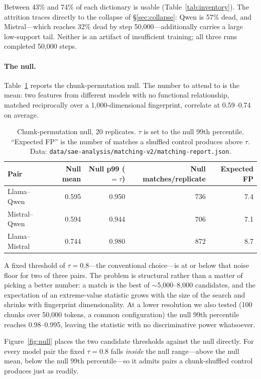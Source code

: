 \documentclass[11pt]{article}
\begin{document}
Between 43\% and 74\% of each dictionary is usable (Table~\ref{tab:inventory}). The
attrition traces directly to the collapse of \S\ref{sec:collapse}: Qwen is 57\% dead,
and Mistral---which reaches 32\% dead by step 50{,}000---additionally carries a large
low-support tail. Neither is an artifact of insufficient training; all three runs
completed 50{,}000 steps.

\paragraph{The null.} Table~\ref{tab:null} reports the chunk-permutation null. The
number to attend to is the mean: two features from different models with no functional
relationship, matched reciprocally over a 1{,}000-dimensional fingerprint, correlate at
0.59--0.74 on average.

\begin{table}[t]
  \centering
  \caption{Chunk-permutation null, 20 replicates. $\tau$ is set to the null 99th
    percentile. ``Expected FP'' is the number of matches a shuffled control produces
    above $\tau$. Data: \texttt{data/sae-analysis/matching-v2/matching-report.json}.}
  \label{tab:null}
  \smallskip
  \begin{tabular}{lrrrr}
    \toprule
    Pair & Null mean & Null p99 ($= \tau$) & Null matches/replicate & Expected FP \\
    \midrule
    Llama--Qwen    & 0.595 & 0.950 & 736 & 7.4 \\
    Mistral--Qwen  & 0.594 & 0.944 & 706 & 7.1 \\
    Llama--Mistral & 0.744 & 0.980 & 872 & 8.7 \\
    \bottomrule
  \end{tabular}
\end{table}

A fixed threshold of $\tau = 0.8$---the conventional choice---is at or below that noise
floor for two of three pairs. The problem is structural rather than a matter of picking a better number:
a match is the best of $\sim$5{,}000--8{,}000 candidates, and the expectation of an
extreme-value statistic grows with the size of the search and shrinks with fingerprint
dimensionality. At a lower resolution we also tested (100 chunks over 50{,}000 tokens,
a common configuration) the null 99th percentile reaches 0.98--0.995, leaving the
statistic with no discriminative power whatsoever.

Figure~\ref{fig:null} places the two candidate thresholds against the null directly. For
every model pair the fixed $\tau = 0.8$ falls \emph{inside} the null range---above the
null mean, below the null 99th percentile---so it admits pairs a chunk-shuffled control
produces just as readily.
\end{document}
